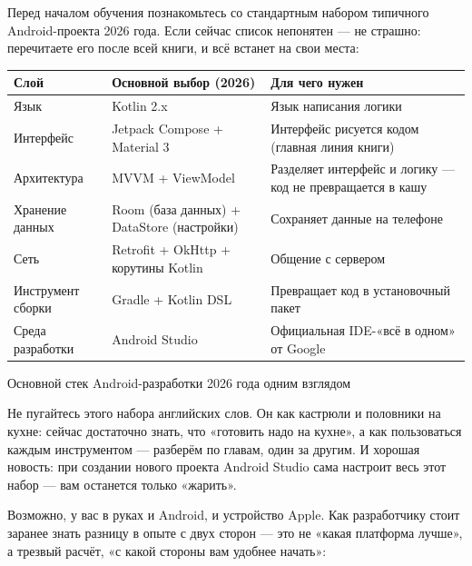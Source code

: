 
Перед началом обучения познакомьтесь со стандартным набором типичного Android-проекта 2026 года. Если сейчас список непонятен — не страшно: перечитаете его после всей книги, и всё встанет на свои места:

\begin{center}
\begin{tabularx}{\linewidth}{|X|X|X|}
\hline
\textbf{Слой} & \textbf{Основной выбор (2026)} & \textbf{Для чего нужен} \tabularnewline
\hline
Язык & Kotlin 2.x & Язык написания логики \tabularnewline
Интерфейс & Jetpack Compose + Material 3 & Интерфейс рисуется кодом (главная линия книги) \tabularnewline
Архитектура & MVVM + ViewModel & Разделяет интерфейс и логику — код не превращается в кашу \tabularnewline
Хранение данных & Room (база данных) + DataStore (настройки) & Сохраняет данные на телефоне \tabularnewline
Сеть & Retrofit + OkHttp + корутины Kotlin & Общение с сервером \tabularnewline
Инструмент сборки & Gradle + Kotlin DSL & Превращает код в установочный пакет \tabularnewline
Среда разработки & Android Studio & Официальная IDE-«всё в одном» от Google \tabularnewline
\hline
\end{tabularx}
\end{center}

\begin{center}\small\color{gray}Основной стек Android-разработки 2026 года одним взглядом\end{center}

Не пугайтесь этого набора английских слов. Он как кастрюли и половники на кухне: сейчас достаточно знать, что «готовить надо на кухне», а как пользоваться каждым инструментом — разберём по главам, один за другим. И хорошая новость: при создании нового проекта Android Studio сама настроит весь этот набор — вам останется только «жарить».


Возможно, у вас в руках и Android, и устройство Apple. Как разработчику стоит заранее знать разницу в опыте с двух сторон — это не «какая платформа лучше», а трезвый расчёт, «с какой стороны вам удобнее начать»:

